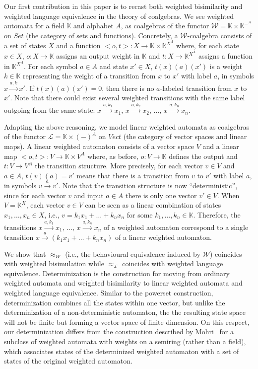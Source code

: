 \documentclass[3p]{elsarticle}
\def\tr#1{\stackrel{#1}{\to}}          %
\newcommand{\fW}{\mathcal{W}}    %
\newcommand{\fL}{\mathcal{L}}    %
\newcommand{\K}{\mathbb{K}}            %
\newcommand{\mar}[1]{\marginpar{ \textbf{MaB:} {\footnotesize #1}}} %
\begin{document}
Our first contribution in this paper is to recast both weighted bisimilarity and
weighted language equivalence in the theory of coalgebras. We see weighted
automata for a field $\K$ and alphabet $A$, as coalgebras of the functor $\fW = \K \times \K^{-^A}$ on $Set$
(the category of sets and functions). Concretely, a $\fW$-coalgebra consists of a set of states $X$
and a function $<o,t>\colon X \to \K \times \K^{X^A}$ where, for each state $x\in X$, $o\colon X \to \K$ assigns
an output weight in $\K$ and $t \colon X \to \K^{X^A}$ assigns a function in $\K^{X^A}$.
For each symbol $a\in A$ and state $x'\in X$, $t(x)(a)(x')$ is a weight $k\in \K$ representing the
weight of a transition from $x$ to $x'$ with label $a$, in symbols $x\tr{a,k}x'$.
If  $t(x)(a)(x')=0$, then there is no $a$-labeled transition from $x$ to $x'$.
Note that there could exist several weighted transitions with the same label outgoing from the same state:
$x \tr{a,k_1}x_1,\, x\tr{a,k_2}x_2,\, \dots ,\, x\tr{a,k_n}x_n$.


Adapting the above reasoning, we model linear weighted automata  as coalgebras
of the functor $\fL = \K \times (-)^A$ on $Vect$ (the category of vector spaces and
linear maps). A linear weighted automaton consists of a vector space $V$ and a linear map $<o,t>\colon V \to \K \times V^A$ where,
as before, $o\colon V \to \K$ defines the output and $t\colon V \to V^A$ the transition structure.
More precisely, for each vector $v\in V$ and $a\in A$, $t(v)(a)=v'$ means that there is a transition
from $v$ to $v'$ with label $a$, in symbols $v \tr{a}v'$.
Note that the transition structure is now ``deterministic'', since for each vector $v$ and input $a \in A$ there is only one vector $v'\in V$.
When $V=\K^X$, each vector $v \in V$ can be seen as a linear combination of states $x_1, \dots, x_n \in X$,
i.e., $v = k_1x_1 + \dots + k_nx_n$ for some $k_1,\dots, k_n \in \K$.
Therefore, the transitions $x \tr{a,k_1}x_1, \, \dots,\, x\tr{a,k_n}x_n$ of a weighted automaton
correspond to a single transition $x\tr{a}(k_1x_1 + \dots + k_nx_n)$ of a linear weighted automaton.

We show that $\approx_{\fW}$ (i.e., the behavioural equivalence induced by $\fW$) coincides
with weighted bisimulation while $\approx_{\fL}$ coincides with weighted language equivalence.
Determinization is the construction for moving from ordinary weighted automata
and weighted bisimilarity to linear weighted automata and weighted
language equivalence. Similar to the powerset construction, determinization
combines all the states within one vector, but unlike the determinization of
a non-deterministic automaton, the the resulting state space will not be finite but
forming a vector space of finite dimension. On this respect, our determinization
differs from the construction described by Mohri~\cite{Moh97} for a subclass of
weighted automata with weights on a semiring (rather than a field), which
associates states of the determinized weighted automaton with a set of states
of the original weighted automaton.
\end{document}
